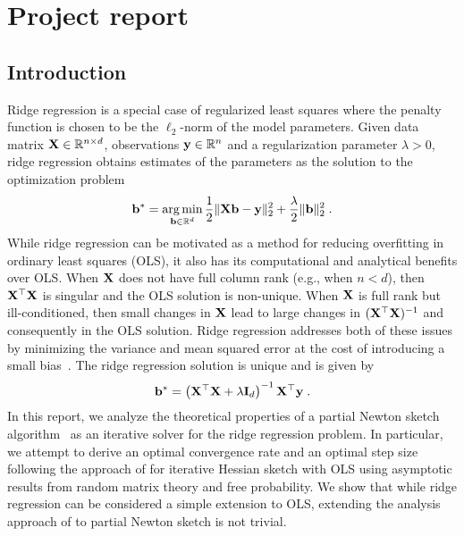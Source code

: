 

\section{Project report}


\begin{abstract}
\todo
\end{abstract}


\subsection{Introduction}

Ridge regression is a special case of regularized least squares where the penalty function is chosen to be the $\ell_2$-norm of the model parameters. Given data matrix $\mathbf{X}\in\mathbb{R}^{n\times d}$, observations $\mathbf{y}\in\mathbb{R}^n$ and a regularization parameter $\lambda>0$, ridge regression obtains estimates of the parameters as the solution to the optimization problem
\[
\mathbf{b}^* = \operatorname*{arg\,min}_{\mathbf{b}\in\mathbb{R}^d} \frac{1}{2}\|\mathbf{X}\mathbf{b}-\mathbf{y}\|_2^2 + \frac{\lambda}{2}\|\mathbf{b}\|_2^2 \;.
\]
While ridge regression can be motivated as a method for reducing overfitting in ordinary least squares (OLS), it also has its computational and analytical benefits over OLS. When $\mathbf{X}$ does not have full column rank (e.g., when $n< d$), then $\mathbf{X}^\top\mathbf{X}$ is singular and the OLS solution is non-unique. When $\mathbf{X}$ is full rank but ill-conditioned, then small changes in $\mathbf{X}$ lead to large changes in $(\mathbf{X}^\top\mathbf{X})^{-1}$ and consequently in the OLS solution. Ridge regression addresses both of these issues by minimizing the variance and mean squared error at the cost of introducing a small bias~\citep{Chowdhury:2018}. The ridge regression solution is unique and is given by
\[
\mathbf{b}^* = \left(\mathbf{X}^\top\mathbf{X} + \lambda\mathbf{I}_d\right)^{-1}\mathbf{X}^\top\mathbf{y} \;.
\]
In this report, we analyze the theoretical properties of a partial Newton sketch algorithm~\citep{Pilanci:2017} as an iterative solver for the ridge regression problem. In particular, we attempt to derive an optimal convergence rate and an optimal step size following the approach of \citet{Lacotte:2020} for iterative Hessian sketch with OLS using asymptotic results from random matrix theory and free probability. We show that while ridge regression can be considered a simple extension to OLS, extending the analysis approach of \citet{Lacotte:2020} to partial Newton sketch is not trivial. \todo
\\

